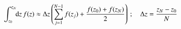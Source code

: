 



\begin{equation}\label{mil4:imp:eq:trapezodial_uniform}
    \int_{z_0}^{z_N} \!\!\mathop{}\!\mathrm{d} {z}\, f(z) \approx \Delta z \left( \sum_{j=1}^{N-1}f(z_j) + \frac{f(z_0) + f(z_{N})}{2} \right)\,; \quad \Delta z= \frac{z_N-z_0}{N}
\end{equation}